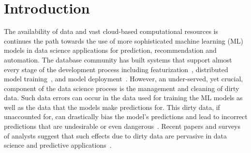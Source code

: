 \section{Introduction}\label{intro}\sloppy
The availability of data and vast cloud-based computational resources is continues the path towards the use of more sophisticated machine learning (ML) models in data science applications for prediction, recommendation and automation.
The database community has built systems that support almost every stage of the development process including featurization~\cite{keystone,zhang2014mat}, distributed model training~\cite{hellerstein2012madlib, crotty2014tupleware, feng2012towards, tensor}, and model deployment~\cite{crankshawmissing}.  
However, an under-served, yet crucial, component of the data science process is the management and cleaning of dirty data.  Such data errors can occur in the data used for training the ML models as well as the data that the models make predictions for.  This dirty data, if unaccounted for, can drastically bias the model's predictions and lead to incorrect predictions that are undesirable or even dangerous~\cite{vanderbilt2012let}.  Recent papers and surveys of analysts suggest that such effects due to dirty data are pervasive in data science and predictive applications~\cite{sculley2014machine,kandel2012,krishnan2016hilda}.



